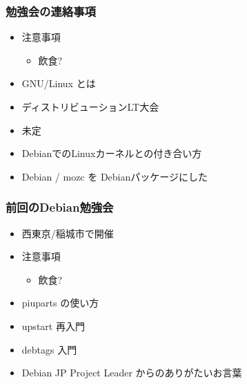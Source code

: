 \frame{\titlepage{}}


\begin{frame}
 \frametitle{勉強会の連絡事項}
\begin{minipage}[t]{0.45\hsize}
  \begin{itemize}
   \item 注意事項
	 \begin{itemize}
	  \item 飲食?
	 \end{itemize}
  \end{itemize}
\end{minipage} 
\begin{minipage}[t]{0.45\hsize}
 \begin{itemize}
  \item GNU/Linux とは
  \item ディストリビューションLT大会
  \item 未定
  \item DebianでのLinuxカーネルとの付き合い方
  \item Debian / mozc を Debianパッケージにした
 \end{itemize}
\end{minipage}
\end{frame}

\begin{frame}
 \frametitle{前回のDebian勉強会}
\begin{minipage}[t]{0.45\hsize}
  \begin{itemize}
   \item 西東京/稲城市で開催
   \item 注意事項
	 \begin{itemize}
	  \item 飲食?
	 \end{itemize}
  \end{itemize}
\end{minipage} 
\begin{minipage}[t]{0.45\hsize}
 \begin{itemize}
  \item piuparts の使い方
  \item upstart 再入門
  \item debtags 入門
  \item Debian JP Project Leader からのありがたいお言葉
 \end{itemize}
\end{minipage}
\end{frame}

